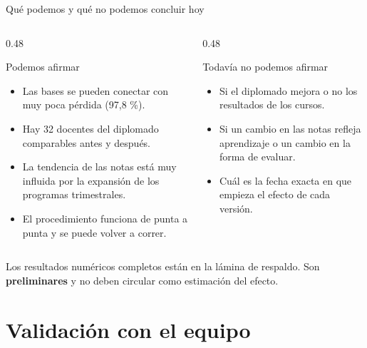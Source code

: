 \documentclass[10pt,aspectratio=169]{beamer}
\begin{document}
\begin{frame}{Qué podemos y qué no podemos concluir hoy}
  \begin{columns}[T]
    \begin{column}{0.48\textwidth}
      \begin{block}{Podemos afirmar}
        \begin{itemize}\small
          \item Las bases se pueden conectar con muy poca pérdida (97,8 \%).
          \item Hay 32 docentes del diplomado comparables antes y después.
          \item La tendencia de las notas está muy influida por la expansión de los programas trimestrales.
          \item El procedimiento funciona de punta a punta y se puede volver a correr.
        \end{itemize}
      \end{block}
    \end{column}
    \begin{column}{0.48\textwidth}
      \begin{alertblock}{Todavía no podemos afirmar}
        \begin{itemize}\small
          \item Si el diplomado mejora o no los resultados de los cursos.
          \item Si un cambio en las notas refleja aprendizaje o un cambio en la forma de evaluar.
          \item Cuál es la fecha exacta en que empieza el efecto de cada versión.
        \end{itemize}
      \end{alertblock}
    \end{column}
  \end{columns}
  \vspace{0.5em}
  {\small Los resultados numéricos completos están en la lámina de respaldo. Son \textbf{preliminares} y no deben circular como estimación del efecto.}
\end{frame}

\section{Validación con el equipo}
\end{document}
